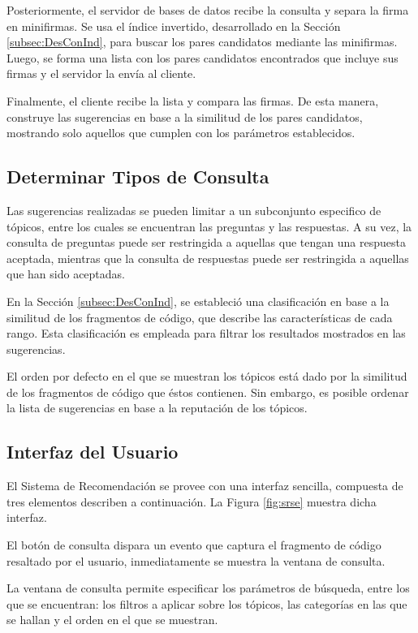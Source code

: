 Posteriormente, el servidor de bases de datos recibe la consulta y separa
la firma en minifirmas. Se usa el índice invertido, desarrollado en la
Sección \ref{subsec:DesConInd}, para buscar los pares candidatos
mediante las minifirmas. Luego, se forma una lista con los pares candidatos
encontrados que incluye sus firmas y el servidor la envía al cliente.

Finalmente, el cliente recibe la lista y compara las firmas. De esta manera,
construye las sugerencias en base a la similitud de los pares candidatos,
mostrando solo aquellos que cumplen con los parámetros establecidos.


\subsection{Determinar Tipos de Consulta}

Las sugerencias realizadas se pueden limitar a un subconjunto especifico 
de tópicos, entre los cuales se encuentran las preguntas y las respuestas.
A su vez, la consulta de preguntas puede ser restringida a aquellas
que tengan una respuesta aceptada, mientras que la consulta de respuestas
puede ser restringida a aquellas que han sido aceptadas.

En la Sección \ref{subsec:DesConInd}, se estableció una clasificación
en base a la similitud de los fragmentos de código, que describe las
características de cada rango. Esta clasificación es empleada
para filtrar los resultados mostrados en las sugerencias.

El orden por defecto en el que se muestran los tópicos está dado
por la similitud de los fragmentos de código que éstos contienen.
Sin embargo, es posible ordenar la lista de sugerencias en base
a la reputación de los tópicos.

\subsection{Interfaz del Usuario}

El Sistema de Recomendación se provee con una interfaz
sencilla, compuesta de tres elementos describen a continuación.
La Figura \ref{fig:srse} muestra dicha interfaz.

El botón de consulta dispara un evento que captura
el fragmento de código resaltado por el usuario,
inmediatamente se muestra la ventana de consulta.

La ventana de consulta permite especificar los 
parámetros de búsqueda, entre los que se encuentran:
los filtros a aplicar sobre los tópicos, 
las categorías en las que se hallan
y el orden en el que se muestran.

